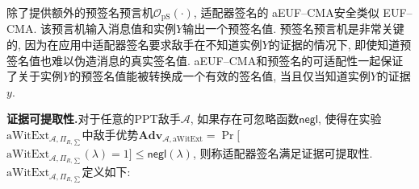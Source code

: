 \documentclass[review]{jcr}
\begin{document}
\begin{center}
\end{center}

除了提供额外的预签名预言机$\mathcal{O}_{\text{pS}}(\cdot)$, 适配器签名的 aEUF–CMA安全类似 EUF–CMA. 该预言机输入消息值和实例$Y$输出一个预签名值. 预签名预言机是非常关键的, 因为在应用中适配器签名要求敌手在不知道实例$Y$的证据的情况下, 即使知道预签名值也难以伪造消息的真实签名值. aEUF–CMA和预签名的可适配性一起保证了关于实例$Y$的预签名值能被转换成一个有效的签名值, 当且仅当知道实例$Y$的证据$y$. 

\begin{trivlist}
\item \textbf{证据可提取性.}对于任意的PPT敌手$\mathcal{A}$, 如果存在可忽略函数$\mathsf{negl}$, 使得在实验$\text{aWitExt}_{\mathcal{A},\Pi_{R,\sum}}$中敌手优势$\textbf{Adv}_{\mathcal{A},\text{aWitExt}}$$=$$\Pr[$$\text{aWitExt}_{\mathcal{A},\Pi_{R,\sum}}(\lambda) = 1] \leq \mathsf{negl}(\lambda)$, 则称适配器签名满足证据可提取性. $\text{aWitExt}_{\mathcal{A},\Pi_{R,\sum}}$定义如下: 
\end{trivlist}
\end{document}
